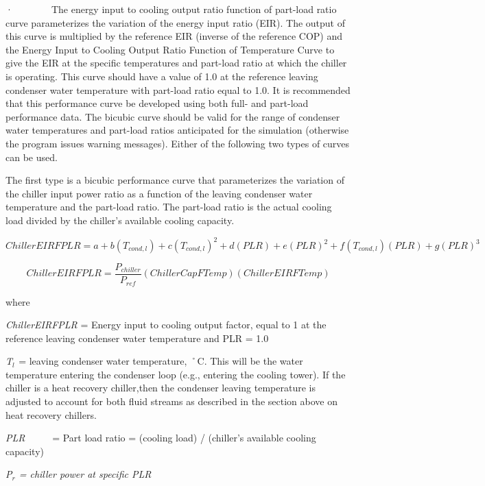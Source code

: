 ·~~~~~~~~The energy input to cooling output ratio function of part-load ratio curve parameterizes the variation of the energy input ratio (EIR). The output of this curve is multiplied by the reference EIR (inverse of the reference COP) and the Energy Input to Cooling Output Ratio Function of Temperature Curve to give the EIR at the specific temperatures and part-load ratio at which the chiller is operating. This curve should have a value of 1.0 at the reference leaving condenser water temperature with part-load ratio equal to 1.0. It is recommended that this performance curve be developed using both full- and part-load performance data. The bicubic curve should be valid for the range of condenser water temperatures and part-load ratios anticipated for the simulation (otherwise the program issues warning messages). Either of the following two types of curves can be used.

The first type is a bicubic performance curve that parameterizes the variation of the chiller input power ratio as a function of the leaving condenser water temperature and the part-load ratio. The part-load ratio is the actual cooling load divided by the chiller's available cooling capacity.

\begin{equation}
ChillerEIRFPLR = a + b({T_{cond,l}}) + c{({T_{cond,l}})^2} + d(PLR) + e{(PLR)^2} + f({T_{cond,l}})(PLR) + g{(PLR)^3}
\end{equation}

\begin{equation}
  ChillerEIRFPLR = \frac{P_{chiller}}{P_{ref}}\left( {ChillerCapFTemp} \right)\left( {ChillerEIRFTemp} \right)
\end{equation}

where

\emph{ChillerEIRFPLR} = Energy input to cooling output factor, equal to 1 at the reference leaving condenser water temperature and PLR = 1.0

\emph{T\(_{l}\)}\(_{ }\) = leaving condenser water temperature, ˚C. This will be the water temperature entering the condenser loop (e.g., entering the cooling tower). If the chiller is a heat recovery chiller,then the condenser leaving temperature is adjusted to account for both fluid streams as described in the section above on heat recovery chillers.

\emph{PLR}~~~~~ = Part load ratio = (cooling load) / (chiller's available cooling capacity)

\emph{P\(_{r}\) = chiller power at specific PLR}


